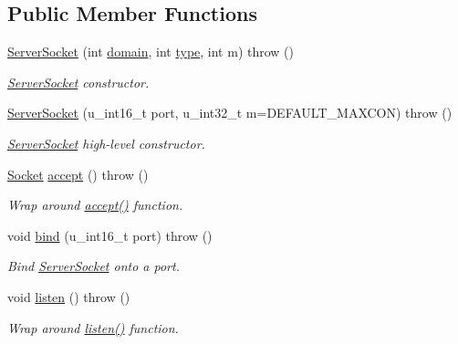 \subsection*{Public Member Functions}
\begin{CompactItemize}
\item 
\hyperlink{classServerSocket_81dab62f8db79ce3e9bf0c6ea2e4799d}{ServerSocket} (int \hyperlink{classSocket_8b042d9fe02795041a5e045604c8b7ec}{domain}, int \hyperlink{classSocket_c7f6980f36023df2004271c336217cb8}{type}, int m)  throw ()
\begin{CompactList}\small\item\em \hyperlink{classServerSocket}{ServerSocket} constructor. \item\end{CompactList}\item 
\hyperlink{classServerSocket_4300657777580374a86d1d25ac3318cd}{ServerSocket} (u\_\-int16\_\-t port, u\_\-int32\_\-t m=DEFAULT\_\-MAXCON)  throw ()
\begin{CompactList}\small\item\em \hyperlink{classServerSocket}{ServerSocket} high-level constructor. \item\end{CompactList}\item 
\hyperlink{classSocket}{Socket} \hyperlink{classServerSocket_19d273ccd11c4358b3079e3d39de23ac}{accept} ()  throw ()
\begin{CompactList}\small\item\em Wrap around \hyperlink{classServerSocket_19d273ccd11c4358b3079e3d39de23ac}{accept()} function. \item\end{CompactList}\item 
void \hyperlink{classServerSocket_5f06d9894c131e56ca57d4f8eb0743e7}{bind} (u\_\-int16\_\-t port)  throw ()
\begin{CompactList}\small\item\em Bind \hyperlink{classServerSocket}{ServerSocket} onto a port. \item\end{CompactList}\item 
void \hyperlink{classServerSocket_de19b5aa12a8bccfa1d020f12de1c857}{listen} ()  throw ()
\begin{CompactList}\small\item\em Wrap around \hyperlink{classServerSocket_de19b5aa12a8bccfa1d020f12de1c857}{listen()} function. \item\end{CompactList}\end{CompactItemize}


